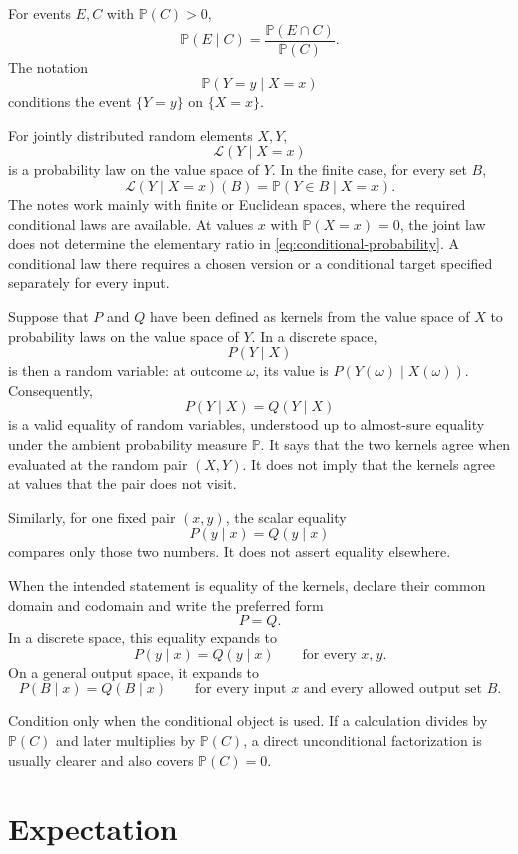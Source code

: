 \documentclass[11pt]{article}
\renewcommand{\P}{\mathbb P}
\newcommand{\Law}{\mathcal L}
\begin{document}
For events \(E,C\) with \(\P(C)>0\),
\begin{equation}
 \P(E\mid C)=\frac{\P(E\cap C)}{\P(C)}.
 \label{eq:conditional-probability}
\end{equation}
The notation
\[
 \P(Y=y\mid X=x)
\]
conditions the event \(\{Y=y\}\) on \(\{X=x\}\).

For jointly distributed random elements \(X,Y\),
\[
 \Law(Y\mid X=x)
\]
is a probability law on the value space of \(Y\). In the finite case, for
every set \(B\),
\[
 \Law(Y\mid X=x)(B)=\P(Y\in B\mid X=x).
\]
The notes work mainly with finite or Euclidean spaces, where the required
conditional laws are available. At values \(x\) with \(\P(X=x)=0\), the joint
law does not determine the elementary ratio in
\cref{eq:conditional-probability}. A conditional law there requires a chosen
version or a conditional target specified separately for every input.

Suppose that \(P\) and \(Q\) have been defined as kernels from the value space
of \(X\) to probability laws on the value space of \(Y\). In a discrete space,
\[
 P(Y\mid X)
 \]
is then a random variable: at outcome \(\omega\), its value is
\(P(Y(\omega)\mid X(\omega))\). Consequently,
\[
 P(Y\mid X)=Q(Y\mid X)
\]
is a valid equality of random variables, understood up to almost-sure
equality under the ambient probability measure \(\P\). It says that the two
kernels agree when evaluated at the random pair \((X,Y)\). It does not imply
that the kernels agree at values that the pair does not visit.

Similarly, for one fixed pair \((x,y)\), the scalar equality
\[
 P(y\mid x)=Q(y\mid x)
\]
compares only those two numbers. It does not assert equality elsewhere.

When the intended statement is equality of the kernels, declare their common
domain and codomain and write the preferred form
\[
 P=Q.
\]
In a discrete space, this equality expands to
\[
 P(y\mid x)=Q(y\mid x)
 \qquad\text{for every }x,y.
\]
On a general output space, it expands to
\[
 P(B\mid x)=Q(B\mid x)
 \qquad\text{for every input }x
 \text{ and every allowed output set }B.
\]

Condition only when the conditional object is used. If a calculation divides
by \(\P(C)\) and later multiplies by \(\P(C)\), a direct unconditional
factorization is usually clearer and also covers \(\P(C)=0\).

\section{Expectation}
\end{document}

